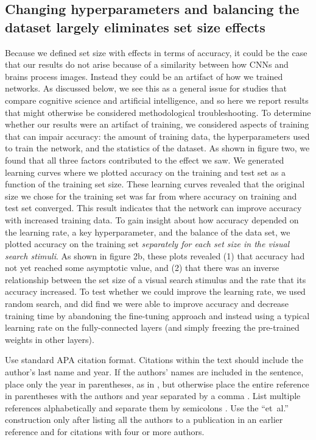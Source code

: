 \documentclass[10pt,letterpaper]{article}
\begin{document}
\subsection{Changing hyperparameters and balancing the dataset largely 
eliminates set size effects}

Because we defined set size with effects in terms of accuracy, it could 
be the case that our results do not arise because of a similarity between 
how CNNs and brains process images. Instead they could be an artifact of 
how we trained networks. As discussed below, we see this as a general issue 
for studies that compare cognitive science and artificial intelligence, and 
so here we report results that might otherwise be considered methodological 
troubleshooting.
To determine whether our results were an artifact of training, we considered aspects of 
training that can impair accuracy: the amount of training data, the hyperparameters 
used to train the network, and the statistics of the dataset. As shown in 
figure two, we found that all three factors contributed to the effect we saw.
We generated learning curves where we plotted accuracy on the training and 
test set as a function of the training set size. These learning curves revealed 
that the original size we chose for the training set was far from where 
accuracy on training and test set converged. This result indicates that the 
network can improve accuracy with increased training data. To gain insight 
about how accuracy depended on the learning rate, a key hyperparameter, and 
the balance of the data set, we plotted accuracy on the training set 
\emph{separately for each set size in the visual search stimuli}. As shown in 
figure 2b, these plots revealed (1) that accuracy had not yet reached some asymptotic 
value, and (2) that there was an inverse relationship between the set size of 
a visual search stimulus and the rate that its accuracy increased.
To test whether we could improve the learning rate, we used random search, and 
did find we were able to improve accuracy and decrease training time by 
abandoning the fine-tuning approach and instead using a typical learning rate 
on the fully-connected layers (and simply freezing the pre-trained weights in other layers). 

Use standard APA citation format. Citations within the text should
include the author's last name and year. If the authors' names are
included in the sentence, place only the year in parentheses, as in
, but otherwise place the entire reference in
parentheses with the authors and year separated by a comma
\cite{NewellSimon1972a}. List multiple references alphabetically and
separate them by semicolons
\cite{ChalnickBillman1988a,NewellSimon1972a}. Use the
``et~al.'' construction only after listing all the authors to a
publication in an earlier reference and for citations with four or
more authors.
\end{document}
